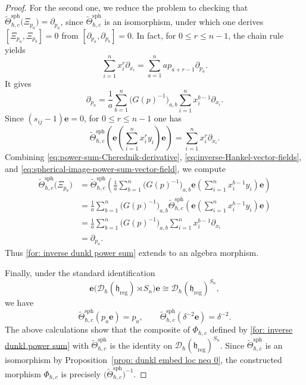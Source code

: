 \documentclass[11pt,reqno]{amsart}
\theoremstyle{definition}
\newcommand{\be}{\mathbf{e}}
\newcommand{\mD}{\mathcal{D}}
\newcommand{\fkh}{\mathfrak{h}}
\newcommand{\reg}{\mathrm{reg}}
\newcommand{\sph}{{\mathrm{sph}}}
\begin{document}
\begin{proof}
	For the second one,
	we reduce the problem to checking that \(\widetilde{\Theta}_{\hbar,c}^{\sph}
	\bigl( \Xi_{p_a} \bigr)
	 = \partial_{p_a}\),
	 since \(\widetilde{\Theta}_{\hbar,c}^{\sph}\) is an isomorphism, under which one derives \([\Xi_{p_a}, \Xi_{p_b}] = 0\) from \([\partial_{p_a}, \partial_{p_b}] = 0\). 
	In fact, 
	for \(0\leq r\leq n-1\), the chain rule yields
	\[
	  \sum_{i=1}^n x_i^r\partial_{x_i}
	  =
	  \sum_{a=1}^n
	  a p_{a+r-1}\partial_{p_a}.
	\]
	It gives
	\begin{equation}\label{eq:inverse-Hankel-vector-fields}
	  \partial_{p_a}
	  =
	  \frac{1}{a}\sum_{b=1}^n
	  \bigl(G(p)^{-1}\bigr)_{a, b}
	  \sum_{i=1}^n x_i^{b-1}\partial_{x_i}.
	\end{equation}
	Since \((s_{ij}-1)\be=0\), for \(0\leq r\leq n-1\) one has
	\begin{equation}\label{eq:spherical-image-power-sum-vector-field}
	  \widetilde\Theta_{\hbar,c}^{\sph}
	  \left(
	    \be\left(\sum_{i=1}^n x_i^r y_i\right)\be
	  \right)
	  =
	  \sum_{i=1}^n x_i^r\partial_{x_i}.
	\end{equation}
	Combining \eqref{eq:power-sum-Cherednik-derivative},
	\eqref{eq:inverse-Hankel-vector-fields}, and
	\eqref{eq:spherical-image-power-sum-vector-field}, we compute
	\[
	\begin{aligned}
	\widetilde{\Theta}_{\hbar,c}^{\sph}
	\bigl( \Xi_{p_a} \bigr)
	&=
	\widetilde{\Theta}_{\hbar,c}^{\sph}
	\left(
	\frac{1}{a}
	\sum_{b=1}^n
	\bigl(G(p)^{-1}\bigr)_{a, b}
	\be
	\left(
	\sum_{i=1}^n x_i^{b-1}y_i
	\right)
	\be
	\right)\\
	&=
	\frac{1}{a}
	\sum_{b=1}^n
	\bigl(G(p)^{-1}\bigr)_{a, b}
	\widetilde{\Theta}_{\hbar,c}^{\sph}
	\left(
	\be
	\left(
	\sum_{i=1}^n x_i^{b-1}y_i
	\right)
	\be
	\right)\\
	&=
	\frac{1}{a}
	\sum_{b=1}^n
	\bigl(G(p)^{-1}\bigr)_{a, b}
	\sum_{i=1}^n x_i^{b-1}\partial_{x_i}\\
	&=
	\partial_{p_a}.
	\end{aligned}
	\]
	Thus
	\eqref{for: inverse dunkl power sum} extends to an algebra morphism.
	
	
	Finally, under the standard identification
	\[
	\be\bigl(\mD_\hbar(\fkh_{\reg})\rtimes S_n\bigr)\be
	\cong
	\mD_\hbar(\fkh_{\reg})^{S_n},
	\]
	we have
	\begin{equation}\label{eq:spherical-dunkl-on-functions}
	\widetilde{\Theta}_{\hbar,c}^{\sph}(p_a\be)=p_a,
	\qquad
	\widetilde{\Theta}_{\hbar,c}^{\sph}(\delta^{-2}\be)=\delta^{-2}.
	\end{equation}
	The above calculations show
	that the composite of \(\Phi_{\hbar, c}\) defined by
	\eqref{for: inverse dunkl power sum} with
	\(\widetilde\Theta_{\hbar,c}^{\sph}\) is the identity on \(\mD_\hbar(\fkh_{\reg})^{S_n}\). Since
	\(\widetilde\Theta_{\hbar,c}^{\sph}\) is an isomorphism by
	Proposition~\ref{prop: dunkl embed loc neq 0}, the constructed morphism \(\Phi_{\hbar,c}\)
	is precisely
	\(\bigl(\widetilde\Theta_{\hbar,c}^{\sph}\bigr)^{-1}\).
\end{proof}
	
\end{document}
